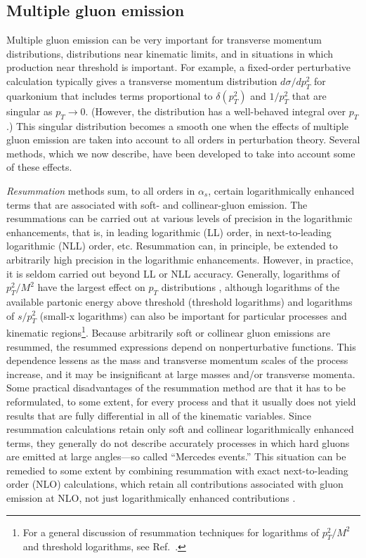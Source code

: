 \subsection{Multiple gluon emission}
\label{prodsec:nrqcdmge}

Multiple gluon emission can be very important for transverse momentum
distributions, distributions near kinematic limits, and in situations in
which production near threshold is important.  For example, a
fixed-order perturbative calculation typically gives a transverse
momentum distribution $d \sigma/dp_T^2$ for quarkonium that includes
terms proportional to $\delta(p_T^2)$ and $1/p_T^2$ that are singular as
$p_T \rightarrow 0$. (However, the distribution has a well-behaved
integral over $p_T$.) This singular distribution becomes a smooth one
when the effects of multiple gluon emission are taken into account to
all orders in perturbation theory. Several methods, which we now
describe, have been developed to take into account some of these
effects.

{\it Resummation} methods sum, to all orders in $\alpha_s$,  certain
logarithmically enhanced terms that are associated with soft- and
collinear-gluon emission. The resummations can be carried out at various
levels of precision in the logarithmic enhancements, that is, in leading 
logarithmic (LL) order, in next-to-leading logarithmic (NLL) order,
etc. Resummation can, in principle, be extended to arbitrarily high
precision in the logarithmic enhancements. However, in practice, it is
seldom carried out beyond LL or NLL accuracy. Generally, logarithms of
$p_T^2/M^2$ have the largest effect on $p_T$ distributions
\cite{Collins:1984kg}, although logarithms of the available partonic
energy above threshold (threshold logarithms) and logarithms of
$s/p_T^2$ (small-x logarithms) can also be important for particular
processes and kinematic regions\footnote{For a general discussion of
resummation techniques for logarithms of $p_T^2/M^2$ and threshold
logarithms, see Ref.~\cite{Contopanagos:1996nh}.}. Because arbitrarily
soft or collinear gluon emissions are resummed, the resummed expressions
depend on nonperturbative functions. This dependence lessens as the mass
and transverse momentum scales of the process increase, and it may be
insignificant at large masses and/or transverse momenta. Some
practical disadvantages of the resummation method are that it has to be
reformulated, to some extent, for every process and that it usually does
not yield results that are fully differential in all of the kinematic
variables. Since resummation calculations retain only soft and collinear
logarithmically enhanced terms, they generally do not describe
accurately processes in which hard gluons are emitted at large
angles---so called ``Mercedes events.'' This situation can be remedied
to some extent by combining resummation with exact next-to-leading order
(NLO) calculations, which retain all contributions associated with gluon
emission at NLO, not just logarithmically enhanced contributions
\cite{Cacciari:1998it}. 

